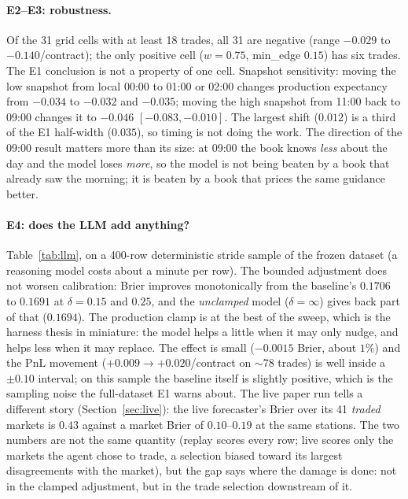 \documentclass[sigconf,review,anonymous]{acmart}
\begin{document}
\paragraph{E2--E3: robustness.} Of the 31 grid cells with at least 18 trades,
all 31 are negative (range $-0.029$ to $-0.140$/contract); the only positive
cell ($w=0.75$, min\_edge $0.15$) has six trades. The E1 conclusion is not a
property of one cell. Snapshot sensitivity: moving the low snapshot from local
00:00 to 01:00 or 02:00 changes production expectancy from $-0.034$ to $-0.032$
and $-0.035$; moving the high snapshot from 11:00 back to 09:00 changes it to
$-0.046$ $[-0.083, -0.010]$. The largest shift ($0.012$) is a third of the E1
half-width ($0.035$), so timing is not doing the work. The direction of the
09:00 result matters more than its size: at 09:00 the book knows \emph{less}
about the day and the model loses \emph{more}, so the model is not being
beaten by a book that already saw the morning; it is beaten by a book that
prices the same guidance better.

\paragraph{E4: does the LLM add anything?} Table~\ref{tab:llm}, on a
400-row deterministic stride sample of the frozen dataset (a reasoning model
costs about a minute per row). The bounded adjustment does not worsen
calibration: Brier improves monotonically from the baseline's $0.1706$ to
$0.1691$ at $\delta = 0.15$ and $0.25$, and the \emph{unclamped} model
($\delta=\infty$) gives back part of that ($0.1694$). The production clamp is
at the best of the sweep, which is the harness thesis in miniature: the model
helps a little when it may only nudge, and helps less when it may replace.
The effect is small ($-0.0015$ Brier, about $1\%$) and the PnL movement
($+0.009 \to +0.020$/contract on $\sim$78 trades) is well inside a $\pm 0.10$
interval; on this sample the baseline itself is slightly positive, which is
the sampling noise the full-dataset E1 warns about. The live paper run tells
a different story (Section~\ref{sec:live}): the live forecaster's Brier over
its 41 \emph{traded} markets is $0.43$ against a market Brier of
$0.10$--$0.19$ at the same stations. The two numbers are not the same
quantity (replay scores every row; live scores only the markets the agent
chose to trade, a selection biased toward its largest disagreements with the
market), but the gap says where the damage is done: not in the clamped
adjustment, but in the trade selection downstream of it.
\end{document}
